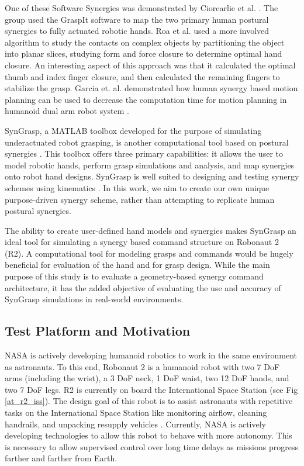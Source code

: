 \documentclass[runningheads,a4paper]{llncs}
\begin{document}
 One of these Software Synergies was demonstrated by Ciorcarlie et al. \cite{ciocarlie_2007_dexterous}.  The group used the GraspIt software to map the two primary human postural synergies to fully actuated robotic hands.  Roa et al. \cite{power_grasp} used a more involved algorithm to study the contacts on complex objects by partitioning the object into planar slices, studying form and force closure  \cite{bicchi} to determine optimal hand closure. An interesting aspect of this approach was that it calculated the optimal thumb and index finger closure, and then calculated the remaining fingers to stabilize the grasp.   Garcia et. al. demonstrated how human synergy based motion planning can be used to decrease the computation time for motion planning in humanoid dual arm robot system  \cite{garcia}.

SynGrasp, a MATLAB toolbox developed for the purpose of simulating underactuated robot grasping, is another computational tool based on postural synergies \cite{syngrasp}.  This toolbox offers three primary capabilities: it allows the user to model robotic hands, perform grasp simulations and analysis, and map synergies onto robot hand designs. SynGrasp is well suited to designing and testing  synergy schemes using kinematics \cite{salvietti_2016_map}.  In this work, we aim to create our own unique purpose-driven synergy scheme, rather than attempting to replicate human postural synergies.

The ability to create user-defined hand models and synergies makes SynGrasp an ideal tool for simulating a synergy based command structure on Robonaut 2 (R2).  A computational tool for modeling grasps and commands would be hugely beneficial for evaluation of the hand and for grasp design. %
While the main purpose of this study is to evaluate a geometry-based synergy command architecture, it has the added objective of evaluating the use and accuracy of SynGrasp simulations in real-world environments.

\subsection{Test Platform and Motivation}

NASA is actively developing humanoid robotics to work in the same environment as astronauts. To this end, Robonaut 2 is a humanoid robot with two 7 DoF arms (including the wrist), a 3 DoF neck, 1 DoF waist, two 12 DoF hands, and two 7 DoF legs. R2 is currently on board the International Space Station (see Fig \ref{at_r2_iss}). The design goal of this robot is to assist astronauts with repetitive tasks on the International Space Station like monitoring airflow, cleaning handrails, and unpacking resupply vehicles \cite{r2_diftler}. Currently, NASA is actively developing technologies to allow this robot to behave with more autonomy. This is necessary to allow supervised control over long time delays as missions progress farther and farther from Earth. 
\end{document}
